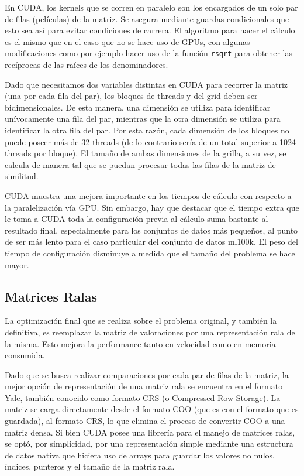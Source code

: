 \documentclass[11pt, a4paper]{article}
\begin{document}
  En CUDA, los kernels que se corren en paralelo son los encargados de un solo
  par de filas (películas) de la matriz. Se asegura mediante guardas
  condicionales que esto sea así para evitar condiciones de carrera. El
  algoritmo para hacer el cálculo es el mismo que en el caso que no se hace uso
  de GPUs, con algunas modificaciones como por ejemplo hacer uso de la función
  \texttt{rsqrt} para obtener las recíprocas de las raíces de los
  denominadores.

  Dado que necesitamos dos variables distintas en CUDA para recorrer la matriz
  (una por cada fila del par), los bloques de threads y del grid deben ser
  bidimensionales. De esta manera, una dimensión se utiliza para identificar
  unívocamente una fila del par, mientras que la otra dimensión se utiliza para
  identificar la otra fila del par. Por esta razón, cada dimensión de los
  bloques no puede poseer más de 32 threads (de lo contrario sería de un total
  superior a 1024 threads por bloque). El tamaño de ambas dimensiones de la
  grilla, a su vez, se calcula de manera tal que se puedan procesar todas las
  filas de la matriz de similitud.

  CUDA muestra una mejora importante en los tiempos de cálculo con respecto a
  la paralelización vía GPU. Sin embargo, hay que destacar que el tiempo extra
  que le toma a CUDA toda la configuración previa al cálculo suma bastante al
  resultado final, especialmente para los conjuntos de datos más pequeños, al
  punto de ser más lento para el caso particular del conjunto de datos ml100k.
  El peso del tiempo de configuración disminuye a medida que el tamaño del
  problema se hace mayor.

  \subsection{Matrices Ralas}

  La optimización final que se realiza sobre el problema original, y también la
  definitiva, es reemplazar la matriz de valoraciones por una representación
  rala de la misma. Esto mejora la performance tanto en velocidad como en
  memoria consumida.
  
  Dado que se busca realizar comparaciones por cada par de filas de la matriz,
  la mejor opción de representación de una matriz rala se encuentra en el
  formato Yale, también conocido como formato CRS (o Compressed Row Storage).
  La matriz se carga directamente desde el formato COO (que es con el formato
  que es guardada), al formato CRS, lo que elimina el proceso de convertir COO
  a una matriz densa. Si bien CUDA posee una librería para el manejo de
  matrices ralas, se optó, por simplicidad, por una representación simple
  mediante una estructura de datos nativa que hiciera uso de arrays para
  guardar los valores no nulos, índices, punteros y el tamaño de la matriz
  rala.
\end{document}
